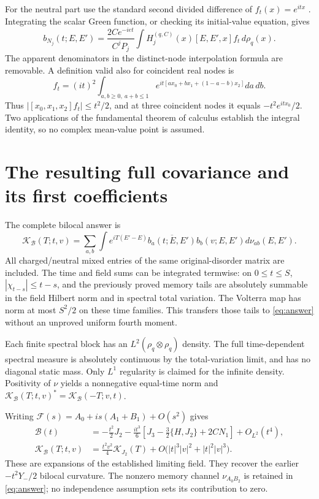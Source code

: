 \documentclass[11pt]{article}
\newcommand{\FF}{\mathcal F}
\newcommand{\BB}{\mathcal B}
\newcommand{\HH}{H^{(q,C)}}
\begin{document}
For the neutral part use the standard second divided difference
of $f_t(x)=e^{itx}$ \cite{DLMF}. Integrating the scalar Green function,
or checking its initial-value equation, gives
\begin{equation}
 \boxed{b_{N_j}(t;E,E')=
 \frac{2Ce^{-iet}}{C^jP_j}\int\HH_j(x)
 [E,E',x]f_t\,d\rho_q(x).}\label{eq:bneutral}
\end{equation}
The apparent denominators in the distinct-node interpolation formula
are removable. A definition valid also for coincident real nodes is
\begin{equation}
 [x_0,x_1,x_2]f_t=(it)^2
 \int_{a,b\ge0,\ a+b\le1}
 e^{it[ax_0+bx_1+(1-a-b)x_2]}da\,db.
\end{equation}
Thus $|[x_0,x_1,x_2]f_t|\le t^2/2$, and at three coincident nodes
it equals $-t^2e^{itx_0}/2$. Two applications of the fundamental
theorem of calculus establish the integral identity, so no complex
mean-value point is assumed.

\newpage
\section{The resulting full covariance and its first coefficients}
The complete bilocal answer is
\begin{equation}
 \boxed{\mathcal K_\BB(T;t,v)=
 \sum_{a,b}\int e^{iT(E'-E)}
 \overline{b_a(t;E,E')}b_b(v;E,E')d\nu_{ab}(E,E').}
 \label{eq:answer}
\end{equation}
All charged/neutral mixed entries of the same original-disorder
matrix are included. The time and field sums can be integrated
termwise: on $0\le t\le S$, $|\chi_{t-s}|\le t-s$, and the previously
proved memory tails are absolutely summable in the field Hilbert
norm and in spectral total variation. The Volterra map has norm
at most $S^2/2$ on these time families. This transfers those tails
to \eqref{eq:answer} without an unproved uniform fourth moment.

Each finite spectral block has an $L^2(\rho_q\otimes\rho_q)$ density.
The full time-dependent spectral measure is absolutely continuous
by the total-variation limit, and has no diagonal static mass.
Only $L^1$ regularity is claimed for the infinite density. Positivity
of $\nu$ yields a nonnegative equal-time norm and
$\mathcal K_\BB(T;t,v)^*=\mathcal K_\BB(-T;v,t)$.

Writing $\FF(s)=A_0+is(A_1+B_1)+O(s^2)$ gives
\begin{align}
 \BB(t)&=-\frac{t^2}{2}J_2
 -\frac{it^3}{6}\left[J_3-\frac32\{H,J_2\}+2CN_1\right]
 +O_{L^2}(t^4),\\
 \mathcal K_\BB(T;t,v)&=\frac{t^2v^2}{4}\mathcal K_{J_2}(T)
 +O\bigl(|t|^3|v|^2+|t|^2|v|^3\bigr).
\end{align}
These are expansions of the established limiting field. They recover
the earlier $-t^2Y_-/2$ bilocal curvature. The nonzero memory channel
$\nu_{A_0B_2}$ is retained in \eqref{eq:answer}; no independence
assumption sets its contribution to zero.
\end{document}
